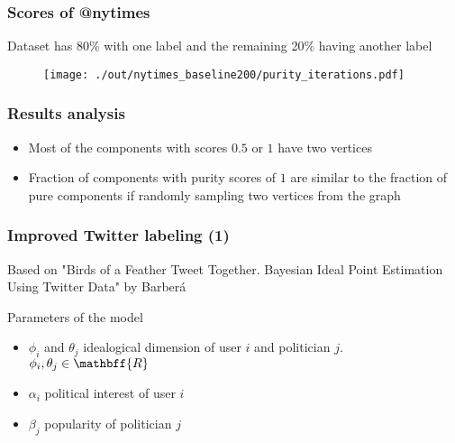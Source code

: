 \documentclass{beamer}
\begin{document}
\begin{frame}[c]
    \frametitle{Scores of @nytimes}

    Dataset has 80\% with one label and the remaining 20\% having another label

    \begin{figure}[H]
        \centering
        \texttt{[image: ./out/nytimes\_baseline200/purity\_iterations.pdf]}
    \end{figure}
\end{frame}

\begin{frame}[c]
    \frametitle{Results analysis}
    \begin{itemize}
        \item Most of the components with scores $0.5$ or $1$ have two vertices
            \item Fraction of components with purity scores of $1$ are similar
                to the fraction of pure components if randomly sampling two
                vertices from the graph
    \end{itemize}
\end{frame}

\begin{frame}[c]
    \frametitle{Improved Twitter labeling (1)}
    Based on "Birds of a Feather Tweet Together. Bayesian Ideal Point
    Estimation Using Twitter Data" by Barberá 

    Parameters of the model
    \begin{itemize}
        \item $\phi_i$ and $\theta_j$ idealogical dimension of user $i$ and
            politician $j$. $\phi_i, \theta_j \in \mathbff{R}$  
        \item $\alpha _i$ political interest of user $i$
        \item $\beta _j$ popularity of politician $j$
    \end{itemize}

\end{frame}
\end{document}
